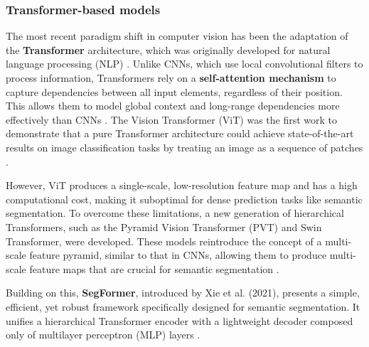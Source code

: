 \documentclass{report}
\begin{document}
\subsubsection*{Transformer-based models}
The most recent paradigm shift in computer vision has been the adaptation of the \textbf{Transformer} architecture, which was originally developed for natural language processing (NLP) \parencites[p.~2]{XieEtAlSegFormerSimpleEfficientDesignSemanticSegmentationTransformers2021}. Unlike CNNs, which use local convolutional filters to process information, Transformers rely on a \textbf{self-attention mechanism} to capture dependencies between all input elements, regardless of their position. This allows them to model global context and long-range dependencies more effectively than CNNs \parencites[p.~6]{LeiEtAlDeeplearningimplementationimagesegmentationagriculturalapplicationscomprehensivereview2024}.
The Vision Transformer (ViT) was the first work to demonstrate that a pure Transformer architecture could achieve state-of-the-art results on image classification tasks by treating an image as a sequence of patches \parencites[p.~2]{XieEtAlSegFormerSimpleEfficientDesignSemanticSegmentationTransformers2021}. \par However, ViT produces a single-scale, low-resolution feature map and has a high computational cost, making it suboptimal for dense prediction tasks like semantic segmentation. To overcome these limitations, a new generation of hierarchical Transformers, such as the Pyramid Vision Transformer (PVT) and Swin Transformer, were developed. These models reintroduce the concept of a multi-scale feature pyramid, similar to that in CNNs, allowing them to produce multi-scale feature maps that are crucial for semantic segmentation \parencites[p.~2;]{XieEtAlSegFormerSimpleEfficientDesignSemanticSegmentationTransformers2021}[p.~6]{LeiEtAlDeeplearningimplementationimagesegmentationagriculturalapplicationscomprehensivereview2024}. \par
Building on this, \textbf{SegFormer}, introduced by Xie et al. (2021), presents a simple, efficient, yet robust framework specifically designed for semantic segmentation. It unifies a hierarchical Transformer encoder with a lightweight decoder composed only of multilayer perceptron (MLP) layers \parencites[p.~1]{XieEtAlSegFormerSimpleEfficientDesignSemanticSegmentationTransformers2021}. \par
\end{document}
